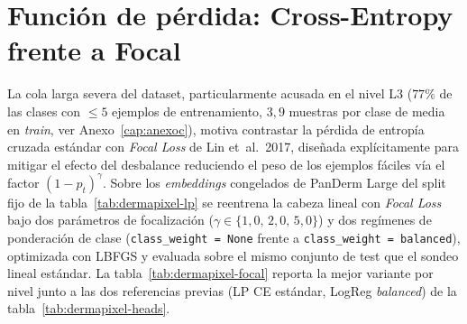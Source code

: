 \section{Función de pérdida: Cross-Entropy frente a Focal}
\label{sec:dermapixel-focal}

La cola larga severa del dataset, particularmente acusada en el
nivel L3 ($77\%$ de las clases con $\leq 5$ ejemplos de
entrenamiento, $3{,}9$ muestras por clase de media en
\emph{train}, ver Anexo~\ref{cap:anexoc}), motiva contrastar la
pérdida de entropía cruzada estándar con \emph{Focal Loss} de
Lin et~al.\ 2017, diseñada explícitamente para mitigar el efecto
del desbalance reduciendo el peso de los ejemplos fáciles vía el
factor $(1-p_t)^\gamma$. Sobre los \emph{embeddings} congelados de
PanDerm Large del split fijo de la tabla~\ref{tab:dermapixel-lp}
se reentrena la cabeza lineal con \emph{Focal Loss} bajo dos
parámetros de focalización ($\gamma \in \{1{,}0,\,2{,}0,\,5{,}0\}$)
y dos regímenes de ponderación de clase
(\texttt{class\_weight = None} frente a
\texttt{class\_weight = balanced}), optimizada con LBFGS y
evaluada sobre el mismo conjunto de test que el sondeo lineal
estándar. La tabla~\ref{tab:dermapixel-focal} reporta la mejor
variante por nivel junto a las dos referencias previas (LP CE
estándar, LogReg \emph{balanced}) de la
tabla~\ref{tab:dermapixel-heads}.

